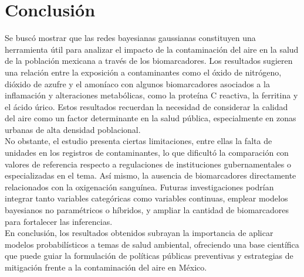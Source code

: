 \documentclass[12pt, letterpaper]{report}
\begin{document}
\section*{Conclusión}

Se buscó mostrar que las redes bayesianas gaussianas constituyen una herramienta útil para analizar el impacto de la contaminación del aire en la salud de la población mexicana a través de los biomarcadores. Los resultados sugieren una relación entre la exposición a contaminantes como el óxido de nitrógeno, dióxido de azufre y el amoníaco con algunos biomarcadores asociados a la inflamación y alteraciones metabólicas, como la proteína C reactiva, la ferritina y el ácido úrico. Estos resultados recuerdan la necesidad de considerar la calidad del aire como un factor determinante en la salud pública, especialmente en zonas urbanas de alta densidad poblacional.
\\

No obstante, el estudio presenta ciertas limitaciones, entre ellas la falta de unidades en los registros de contaminantes, lo que dificultó la comparación con valores de referencia respecto a regulaciones de instituciones gubernamentales o especializadas en el tema. Así mismo, la ausencia de biomarcadores directamente relacionados con la oxigenación sanguínea. Futuras investigaciones podrían integrar tanto variables categóricas como variables continuas, emplear modelos bayesianos no paramétricos o híbridos, y ampliar la cantidad de biomarcadores para fortalecer las inferencias.
\\

En conclusión, los resultados obtenidos subrayan la importancia de aplicar modelos probabilísticos a temas de salud ambiental, ofreciendo una base científica que puede guiar la formulación de políticas públicas preventivas y estrategias de mitigación frente a la contaminación del aire en México.

\printbibliography[title={Referencias}]
\end{document}
